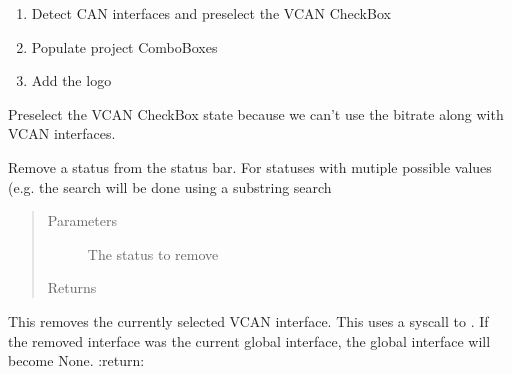 \documentclass[letterpaper,10pt,english]{sphinxmanual}
\begin{document}
\begin{fulllineitems}
\begin{fulllineitems}
\begin{enumerate}
\item {} 
Detect CAN interfaces and preselect the VCAN CheckBox

\item {} 
Populate project ComboBoxes

\item {} 
Add the logo

\end{enumerate}

\end{fulllineitems}


\begin{fulllineitems}
\label{\detokenize{src:src.MainTab.MainTab.preselectUseBitrateCheckBox}}
Preselect the VCAN CheckBox state because we can’t use the bitrate along with VCAN interfaces.

\end{fulllineitems}


\begin{fulllineitems}
\label{\detokenize{src:src.MainTab.MainTab.removeApplicationStatus}}
Remove a status from the status bar.
For statuses with mutiple possible values (e.g. 
the search will be done using a substring search
\begin{quote}\begin{description}
\item[{Parameters}] \leavevmode
{} \textendash{} The status to remove

\item[{Returns}] \leavevmode


\end{description}\end{quote}

\end{fulllineitems}


\begin{fulllineitems}
\label{\detokenize{src:src.MainTab.MainTab.removeVCANInterface}}
This removes the currently selected VCAN interface. This uses a syscall to .
If the removed interface was the current global interface, the global interface will become None.
:return:


\end{fulllineitems}
\end{fulllineitems}
\end{document}
